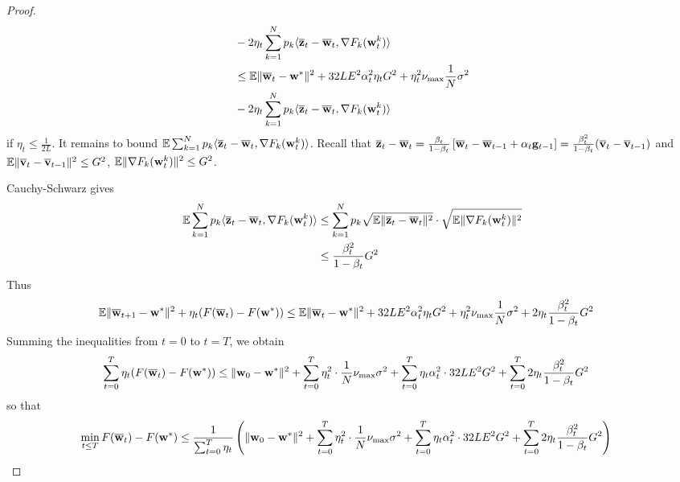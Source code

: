 \begin{proof}
\begin{align*}
	& -2\eta_{t}\sum_{k=1}^{N}p_{k}\langle{\overline{\mathbf{z}}}_{t}-{\overline{\mathbf{w}}}_{t},\nabla F_{k}({\mathbf{w}}_{t}^{k})\rangle\\
	& \leq\mathbb{E}\|{\overline{\mathbf{w}}}_{t}-{\mathbf{w}}^{\ast}\|^{2}+32LE^{2}\alpha_{t}^{2}\eta_{t}G^{2}+\eta_{t}^{2}\nu_{\max}\frac{1}{N}\sigma^{2}\\
	& -2\eta_{t}\sum_{k=1}^{N}p_{k}\langle{\overline{\mathbf{z}}}_{t}-{\overline{\mathbf{w}}}_{t},\nabla F_{k}({\mathbf{w}}_{t}^{k})\rangle
	\end{align*}
	if $\eta_{t}\leq\frac{1}{2L}$. It remains to bound $\mathbb{E}\sum_{k=1}^{N}p_{k}\langle{\overline{\mathbf{z}}}_{t}-{\overline{\mathbf{w}}}_{t},\nabla F_{k}({\mathbf{w}}_{t}^{k})\rangle$.
	Recall that ${\overline{\mathbf{z}}}_{t}-{\overline{\mathbf{w}}}_{t}=\frac{\beta_{t}}{1-\beta_{t}}\left[{\overline{\mathbf{w}}}_{t}-{\overline{\mathbf{w}}}_{t-1}+\alpha_{t}{\mathbf{g}}_{t-1}\right]=\frac{\beta_{t}^{2}}{1-\beta_{t}}({\overline{\mathbf{v}}}_{t}-{\overline{\mathbf{v}}}_{t-1})$
	and $\mathbb{E}\|{\overline{\mathbf{v}}}_{t}-{\overline{\mathbf{v}}}_{t-1}\|^{2}\leq G^{2}$,
	$\mathbb{E}\|\nabla F_{k}({\mathbf{w}}_{t}^{k})\|^{2}\leq G^{2}$. 
	
	Cauchy-Schwarz gives
	\begin{align*}
	\mathbb{E}\sum_{k=1}^{N}p_{k}\langle{\overline{\mathbf{z}}}_{t}-{\overline{\mathbf{w}}}_{t},\nabla F_{k}({\mathbf{w}}_{t}^{k})\rangle & \leq\sum_{k=1}^{N}p_{k}\sqrt{\mathbb{E}\|{\overline{\mathbf{z}}}_{t}-{\overline{\mathbf{w}}}_{t}\|^{2}}\cdot\sqrt{\mathbb{E}\|\nabla F_{k}({\mathbf{w}}_{t}^{k})\|^{2}}\\
	& \leq\frac{\beta_{t}^{2}}{1-\beta_{t}}G^{2}
	\end{align*}
	Thus 
	\begin{align*}
	\mathbb{E}\|{\overline{\mathbf{w}}}_{t+1}-{\mathbf{w}}^{\ast}\|^{2}+\eta_{t}(F({\overline{\mathbf{w}}}_{t})-F({\mathbf{w}}^{\ast})) & \leq\mathbb{E}\|{\overline{\mathbf{w}}}_{t}-{\mathbf{w}}^{\ast}\|^{2}+32LE^{2}\alpha_{t}^{2}\eta_{t}G^{2}+\eta_{t}^{2}\nu_{\max}\frac{1}{N}\sigma^{2}+2\eta_{t}\frac{\beta_{t}^{2}}{1-\beta_{t}}G^{2}
	\end{align*}
	Summing the inequalities from $t=0$ to $t=T$, we obtain 
	\begin{align*}
	\sum_{t=0}^{T}\eta_{t}(F({\overline{\mathbf{w}}}_{t})-F({\mathbf{w}}^{\ast})) & \leq\|{\mathbf{w}}_{0}-{\mathbf{w}}^{\ast}\|^{2}+\sum_{t=0}^{T}\eta_{t}^{2}\cdot\frac{1}{N}\nu_{\max}\sigma^{2}+\sum_{t=0}^{T}\eta_{t}\alpha_{t}^{2}\cdot32LE^{2}G^{2}+\sum_{t=0}^{T}2\eta_{t}\frac{\beta_{t}^{2}}{1-\beta_{t}}G^{2}
	\end{align*}
	so that
	\begin{align*}
	\min_{t\leq T}F({\overline{\mathbf{w}}}_{t})-F({\mathbf{w}}^{\ast}) & \leq\frac{1}{\sum_{t=0}^{T}\eta_{t}}\left(\|{\mathbf{w}}_{0}-{\mathbf{w}}^{\ast}\|^{2}+\sum_{t=0}^{T}\eta_{t}^{2}\cdot\frac{1}{N}\nu_{\max}\sigma^{2}+\sum_{t=0}^{T}\eta_{t}\alpha_{t}^{2}\cdot32LE^{2}G^{2}+\sum_{t=0}^{T}2\eta_{t}\frac{\beta_{t}^{2}}{1-\beta_{t}}G^{2}\right)
	\end{align*}
	

\end{proof}
